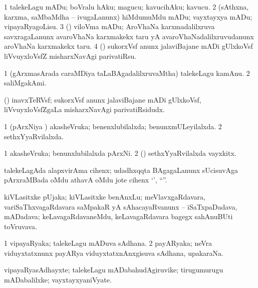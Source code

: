 \bentry
{}
\gl{\sakirx}
\bmng
\bnum
\num{1} talekeLagu mADu; boVralu hAku; magucu; kavucihAku; kavucu. 
\num{2} (sAthxna, karxma, saMbaMdha -- ivugaLanunx) hiMdumuMdu mADu; vayxtayxya mADu; vipayaRyagoLisu. 
\num{3} (\saM) viloVma mADu; AroVhaNa karxmadalilxruva savxragaLanunx avaroVhaNa karxmakekx taru yA avaroVhaNadalilxruvudanunx aroVhaNa karxmakekx taru. 
\num{4} (\ravi) sukorxVsf anunx jalaviBajane mADi gUlxkoVsf liVvuyxloVsfZ misharxNavAgi parivatiRsu. 
\enum
\emng
\eentry

\bentry
{}
\gl{\nA}
\bmng
\bnum
\num{1} (gArxmasArada caraMDiya taLaBAgadalilxruvaMtha) talekeLagu kamAnu. 
\num{2} saliMgakAmi. 
\enum
\emng
\eentry

\bentry
{}
\gl{\nA}
\bmng
(\ravi) inavxTeRVsf; sukorxVsf anunx jalaviBajane mADi gUlxkoVsf, liVvuyxloVsfZgaLa misharxNavAgi parivatiRsidudx. 
\emng
\eentry

\bentry
{}
\gl{\gu}
\bmng
\bnum
\num{1} (pArxNiya \vi) akasheVruka; benenxlubilalxda; benunxmULeyilalxda. 
\num{2} sethxYyaRvilalxda. 
\enum
\emng
\eentry

\bentry
{}
\gl{\nA}
\bmng
\bnum
\num{1} akasheVruka; benunxlubilalxda pArxNi. 
\num{2} (\rUpa) sethxYyaRvilalxda vayxkitx. 
\enum
\emng
\eentry

\bentry
{}
\gl{\nA}
\bmng
talekeLagAda alapxvirAma cihenx; udadhxqqta BAgagaLanunx sUcisuvAga pArxraMBada oMdu athavA oMdu jote cihenx `\eng{$\ldots$}', ``\eng{$\ldots$}''. 
\emng
\eentry

\bentry
{}
\gl{\nA}
\bmng
kiVLasitxke pUjaka; kiVLasitxke benAnxLu; meVlavxgaRdavara, variSaThxvagaRdavara saMpakaR yA sAhacayaRvanunx -- iSaTxpaDadava, mADadava; keLavagaRdavaneMdu, keLavagaRdavara bagegx sahAnuBUti toVruvava. 
\emng
\eentry

\bentry
{}
\gl{\nA}
\bmng
\bnum
\num{1} vipayaRyaka; talekeLagu mADuva sAdhana. 
\num{2} payARyaka; neVra viduyxtatxnunx payARya viduyxtatxnAnxgisuva sAdhana, upakaraNa. 
\enum
\emng
\eentry

\bentry
{}
\gl{\nA}
\bmng
vipayaRyasAdhayxte; talekeLagu mADabahudAgiruvike; tirugumurugu mADabalilxke; vayxtayxyaniVyate. 
\emng
\eentry

